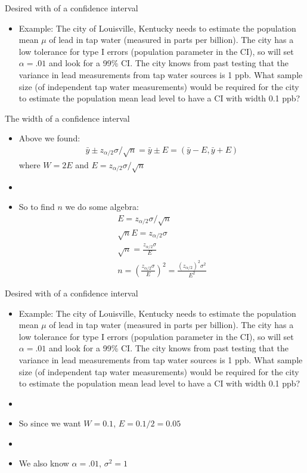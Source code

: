 \documentclass[xcolor=dvipsnames]{beamer}
\begin{document}
\begin{frame}{Desired with of a confidence interval}
	\begin{itemize}
		\item Example: The city of Louisville, Kentucky needs to estimate the population mean $\mu$ of lead in tap water (measured in parts per billion). The city has a low tolerance for type I errors (population parameter in the CI), so will set $\alpha = .01$ and look for a 99\% CI. The city knows from past testing that the variance in lead measurements from tap water sources is 1 ppb. What sample size (of independent tap water measurements) would be required for the city to estimate the population mean lead level to have a CI with width 0.1 ppb?
	\end{itemize}
\end{frame}

\begin{frame}{The width of a confidence interval}
\begin{itemize}
	\item Above we found:
	\begin{align*}
	\bar{y}\pm z_{\alpha/2} \sigma / \sqrt{n} = \bar{y} \pm E = (\bar{y}-E, \bar{y}+E)
	\end{align*}
	where $W = 2E$ and $E = z_{\alpha/2} \sigma / \sqrt{n}$  \pause
	\item[]
	\item So to find $n$ we do some algebra:
	\begin{gather*}
		E = z_{\alpha/2} \sigma / \sqrt{n} \\ 
		\sqrt{n} E = z_{\alpha/2} \sigma  \\
		\sqrt{n} = \frac{z_{\alpha/2} \sigma}{E} \\
		n = \left(\frac{z_{\alpha/2} \sigma}{E}\right)^2 = \frac{(z_{\alpha/2})^2 \sigma^2}{E^2}
	\end{gather*}
\end{itemize}
\end{frame}

\begin{frame}{Desired with of a confidence interval}
		\begin{itemize}
		\item Example: The city of Louisville, Kentucky needs to estimate the population mean $\mu$ of lead in tap water (measured in parts per billion). The city has a low tolerance for type I errors (population parameter in the CI), so will set $\alpha = .01$ and look for a 99\% CI. The city knows from past testing that the variance in lead measurements from tap water sources is 1 ppb. What sample size (of independent tap water measurements) would be required for the city to estimate the population mean lead level to have a CI with width 0.1 ppb? \pause
		\item[]
		\item So since we want $W = 0.1$, $E = 0.1/2 = 0.05$ \pause
		\item[]
		\item We also know $\alpha = .01$, $\sigma^2 = 1$
	\end{itemize}
\end{frame}
\end{document}
